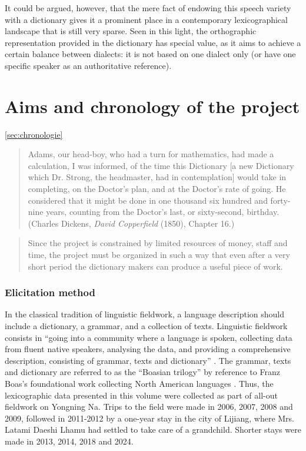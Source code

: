 It could be argued, however, that the mere fact of endowing this speech variety with a dictionary gives it a prominent place in a contemporary lexicographical landscape that is still very sparse. Seen in this light, the orthographic representation provided in the dictionary has special value, as it aims to achieve a certain balance between dialects: it is not based on one dialect only (or have one specific speaker as an authoritative reference).

\section{Aims and chronology of the project}
\ref{sec:chronologie}

\begin{quotation}
    Adams, our head-boy, who had a turn for mathematics, had made a calculation, I was informed, of the time this Dictionary [a new Dictionary which Dr. Strong, the headmaster, had in contemplation] would take in completing, on the Doctor’s plan, and at the Doctor’s rate of going. He considered that it might be done in one thousand six hundred and forty-nine years, counting from the Doctor’s last, or sixty-second, birthday. (Charles Dickens, \emph{David Copperfield} (1850), Chapter 16.)
\end{quotation}

\begin{quotation}
    Since the project is constrained by limited resources of money, staff and time, the project must be organized in such a way that even after a very short period the dictionary makers can produce a useful piece of work. \parencite[``Dictionary making in endangered speech communities'':][42]{mosel_dictionary_2004}
\end{quotation}

\subsubsection{Elicitation method}

In the classical tradition of linguistic fieldwork, a language description should include a dictionary, a grammar, and a collection of texts. Linguistic fieldwork consists in “going into a community where a language is spoken, collecting data from fluent native speakers, analysing the data, and providing a comprehensive description, consisting of grammar, texts and dictionary” \parencite[12]{dixon2007}. The grammar, texts and dictionary are referred to as the “Boasian trilogy” \parencite{foley1999} by reference to Franz Boas’s foundational work collecting North American languages \parencite{boas1902,boasetal1911}. Thus, the lexicographic data presented in this volume were collected as part of all-out fieldwork on Yongning Na. Trips to the field were made in 2006, 2007, 2008 and 2009, followed in 2011-2012 by a one-year stay in the city of Lijiang, where Mrs. Latami Daeshi Lhamu had settled to take care of a grandchild. Shorter stays were made in 2013, 2014, 2018 and 2024.

